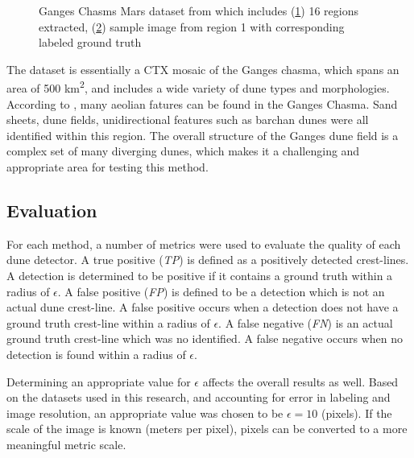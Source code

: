 \begin{figure}
	\centering
	\begin{subfigure}{\textwidth}
		\centering
		\caption{}
		\label{fig:ganges_regions}
	\end{subfigure}
	\begin{subfigure}{\textwidth}
		\centering
		\caption{}
		\label{fig:ganges1_image}
	\end{subfigure}
	\caption{Ganges Chasms Mars dataset from \cite{vaz_object_based_dune_analysis} which includes (\ref{fig:ganges_regions}) 16 regions extracted, (\ref{fig:ganges1_image}) sample image from region 1 with corresponding labeled ground truth}
	\label{fig:mars_ganges_dataset}
\end{figure}


The dataset is essentially a CTX mosaic of the Ganges chasma, which spans an area of 500 km\textsuperscript{2}, and includes a wide variety of dune types and morphologies. According to \cite{fenton_aeolian_sediment_ganges_chasma_mars}, many aeolian fatures can be found in the Ganges Chasma. Sand sheets, dune fields, unidirectional features such as barchan dunes were all identified within this region. The overall structure of the Ganges dune field is a complex set of many diverging dunes, which makes it a challenging and appropriate area for testing this method. 


\subsection{Evaluation}\label{subsec:evaluation}

For each method, a number of metrics were used to evaluate the quality of each dune detector. A true positive (\emph{TP}) is defined as a positively detected crest-lines. A detection is determined to be positive if it contains a ground truth within a radius of $\epsilon$. A false positive (\emph{FP}) is defined to be a detection which is not an actual dune crest-line. A false positive occurs when a detection does not have a ground truth crest-line within a radius of $\epsilon$. A false negative (\emph{FN}) is an actual ground truth crest-line which was no identified. A false negative occurs when no detection is found within a radius of $\epsilon$.

Determining an appropriate value for $\epsilon$ affects the overall results as well. Based on the datasets used in this research, and accounting for error in labeling and image resolution, an appropriate value was chosen to be $\epsilon=10$ (pixels). If the scale of the image is known (meters per pixel), pixels can be converted to a more meaningful metric scale.

